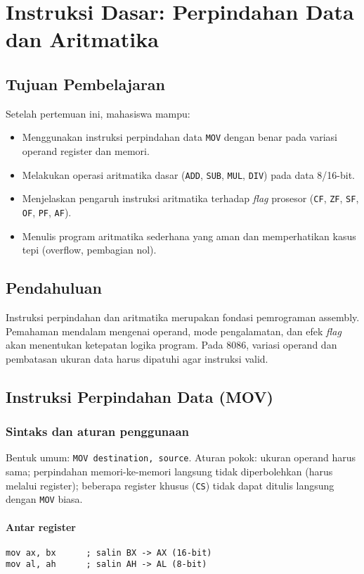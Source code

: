 \chapter{Instruksi Dasar: Perpindahan Data dan Aritmatika}

\section{Tujuan Pembelajaran}
Setelah pertemuan ini, mahasiswa mampu:
\begin{itemize}
    \item Menggunakan instruksi perpindahan data \texttt{MOV} dengan benar pada variasi operand register dan memori.
    \item Melakukan operasi aritmatika dasar (\texttt{ADD}, \texttt{SUB}, \texttt{MUL}, \texttt{DIV}) pada data 8/16-bit.
    \item Menjelaskan pengaruh instruksi aritmatika terhadap \textit{flag} prosesor (\texttt{CF}, \texttt{ZF}, \texttt{SF}, \texttt{OF}, \texttt{PF}, \texttt{AF}).
    \item Menulis program aritmatika sederhana yang aman dan memperhatikan kasus tepi (overflow, pembagian nol).
\end{itemize}

\section{Pendahuluan}
Instruksi perpindahan dan aritmatika merupakan fondasi pemrograman assembly. Pemahaman mendalam mengenai operand, mode pengalamatan, dan efek \textit{flag} akan menentukan ketepatan logika program. Pada 8086, variasi operand dan pembatasan ukuran data harus dipatuhi agar instruksi valid.

\section{Instruksi Perpindahan Data (MOV)}
\subsection{Sintaks dan aturan penggunaan}
Bentuk umum: \texttt{MOV destination, source}. Aturan pokok: ukuran operand harus sama; perpindahan memori-ke-memori langsung tidak diperbolehkan (harus melalui register); beberapa register khusus (\texttt{CS}) tidak dapat ditulis langsung dengan \texttt{MOV} biasa.

\subsubsection{Antar register}
\begin{verbatim}
mov ax, bx      ; salin BX -> AX (16-bit)
mov al, ah      ; salin AH -> AL (8-bit)
\end{verbatim}

